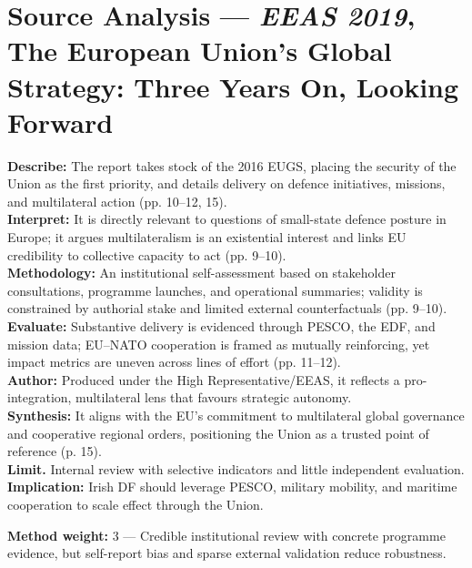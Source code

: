 \section*{Source Analysis — \textit{EEAS 2019}, The European Union’s Global Strategy: Three Years On, Looking Forward}
\textbf{Describe:} The report takes stock of the 2016 EUGS, placing the security of the Union as the first priority, and details delivery on defence initiatives, missions, and multilateral action (pp. 10–12, 15).\\
\textbf{Interpret:} It is directly relevant to questions of small-state defence posture in Europe; it argues multilateralism is an existential interest and links EU credibility to collective capacity to act (pp. 9–10).\\
\textbf{Methodology:} An institutional self-assessment based on stakeholder consultations, programme launches, and operational summaries; validity is constrained by authorial stake and limited external counterfactuals (pp. 9–10).\\
\textbf{Evaluate:} Substantive delivery is evidenced through PESCO, the EDF, and mission data; EU–NATO cooperation is framed as mutually reinforcing, yet impact metrics are uneven across lines of effort (pp. 11–12).\\
\textbf{Author:} Produced under the High Representative/EEAS, it reflects a pro-integration, multilateral lens that favours strategic autonomy.\\
\textbf{Synthesis:} It aligns with the EU’s commitment to multilateral global governance and cooperative regional orders, positioning the Union as a trusted point of reference (p. 15).\\
\textbf{Limit.} Internal review with selective indicators and little independent evaluation.\\
\textbf{Implication:} Irish DF should leverage PESCO, military mobility, and maritime cooperation to scale effect through the Union.

\textbf{Method weight:} 3 — Credible institutional review with concrete programme evidence, but self-report bias and sparse external validation reduce robustness.

